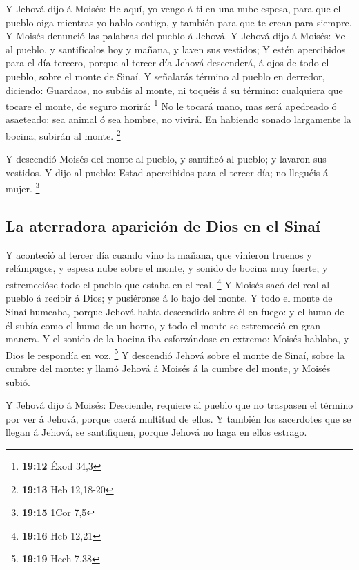  Y Jehová dijo á Moisés: He aquí, yo vengo á ti en una
nube espesa, para que el pueblo oiga mientras yo hablo contigo, y
también para que te crean para siempre. Y Moisés denunció las palabras
del pueblo á Jehová.  Y Jehová dijo á Moisés: Ve al
pueblo, y santifícalos hoy y mañana, y laven sus vestidos;
 Y estén apercibidos para el día tercero, porque al
tercer día Jehová descenderá, á ojos de todo el pueblo, sobre el monte
de Sinaí.  Y señalarás término al pueblo en derredor,
diciendo: Guardaos, no subáis al monte, ni toquéis á su término:
cualquiera que tocare el monte, de seguro morirá: \footnote{\textbf{19:12}
  Éxod 34,3}  No le tocará mano, mas será apedreado ó
asaeteado; sea animal ó sea hombre, no vivirá. En habiendo sonado
largamente la bocina, subirán al monte. \footnote{\textbf{19:13} Heb
  12,18-20}

 Y descendió Moisés del monte al pueblo, y santificó al
pueblo; y lavaron sus vestidos.  Y dijo al pueblo: Estad
apercibidos para el tercer día; no lleguéis á mujer. \footnote{\textbf{19:15}
  1Cor 7,5}

\hypertarget{la-aterradora-apariciuxf3n-de-dios-en-el-sinauxed}{%
\subsection{La aterradora aparición de Dios en el
Sinaí}\label{la-aterradora-apariciuxf3n-de-dios-en-el-sinauxed}}

 Y aconteció al tercer día cuando vino la mañana, que
vinieron truenos y relámpagos, y espesa nube sobre el monte, y sonido de
bocina muy fuerte; y estremecióse todo el pueblo que estaba en el real.
\footnote{\textbf{19:16} Heb 12,21}  Y Moisés sacó del
real al pueblo á recibir á Dios; y pusiéronse á lo bajo del monte.
 Y todo el monte de Sinaí humeaba, porque Jehová había
descendido sobre él en fuego: y el humo de él subía como el humo de un
horno, y todo el monte se estremeció en gran manera.  Y
el sonido de la bocina iba esforzándose en extremo: Moisés hablaba, y
Dios le respondía en voz. \footnote{\textbf{19:19} Hech 7,38}
 Y descendió Jehová sobre el monte de Sinaí, sobre la
cumbre del monte: y llamó Jehová á Moisés á la cumbre del monte, y
Moisés subió.

 Y Jehová dijo á Moisés: Desciende, requiere al pueblo
que no traspasen el término por ver á Jehová, porque caerá multitud de
ellos.  Y también los sacerdotes que se llegan á Jehová,
se santifiquen, porque Jehová no haga en ellos estrago.

